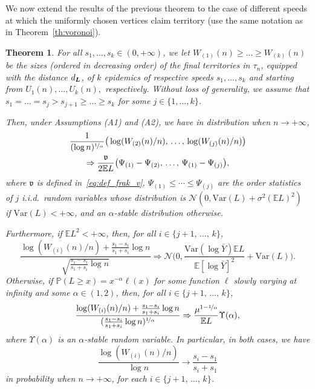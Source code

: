 \documentclass[10pt]{amsart}
\newtheorem{theo}{Theorem}[section]
\theoremstyle{definition}\newtheorem{defi}[theo]{Definition}\newtheorem{rema}[theo]{Remark}\newtheorem{exam}[theo]{Example}\newtheorem{exem}[theo]{Example}\newtheorem{nota}[theo]{Notation}
\newcommand{\bs}{\ensuremath{\boldsymbol}}
\newcommand{\bbP}{\mathbb{P}}
\newcommand{\bbE}{\mathbb{E}}
\newcommand{\clN}{\mathcal{N}}
\newcommand{\Var}{\mathrm{Var}}
\newcommand{\frkv}{\mathfrak{v}}
\begin{document}
We now extend the results of the previous theorem to the case of different speeds at which the uniformly chosen vertices claim territory (use the same notation as in Theorem~\ref{th:voronoi}).


\begin{theo}\label{th:territories}
For all $s_1, \ldots, s_k\in (0,+\infty)$, we let $W_{(1)}(n)\geq \ldots \geq W_{(k)}(n)$ be the sizes (ordered in decreasing order) of the final territories in $\tau_n$, equipped with the distance $d_{\bs L}$, of $k$ epidemics of respective speeds $s_1, \ldots, s_k$ and starting from $U_1(n), \ldots, U_k(n),$ respectively. Without loss of generality, we assume that $s_1 = \ldots = s_j > s_{j+1} \geq \ldots\geq s_k$ for some $j\in\{1,\dots,k\}$.

Then, under Assumptions {\rm (A1)} and {\rm (A2)}, we have in distribution when $n\to+\infty$,
\begin{multline}\label{eq:terPrincipalConv}
\frac1{(\log n)^{\nicefrac1\alpha}}\big(\log (W_{(2)}(n)/n), \,\ldots,\, \log (W_{(j)}(n)/n)\big)\\
\Rightarrow\frac{\frkv}{2\bbE L}
\big(\Psi_{(1)}-\Psi_{(2)}, \,\ldots,\, \Psi_{(1)}-\Psi_{(j)}\big),
\end{multline}
where $\frkv$ is defined in~\eqref{eq:def_frak_v}, $\Psi_{(1)}\leq \cdots\leq \Psi_{(j)}$ are the order statistics of $j$ i.i.d.\ random variables whose distribution is $\clN(0, \Var(L) + \sigma^2 (\bbE L)^2)$ if $\Var(L)<+\infty$, and an $\alpha$-stable distribution otherwise.

Furthermore, if $\bbE L^2<+\infty$, then, for all $i \in \{j+1, \,\ldots,\, k\}$,
\[
\frac{\log(W_{(i)}(n)/n) + \frac{s_1-s_i}{s_1+s_i}\log n}{\sqrt{\frac{s_1-s_i}{s_1+s_i}\log n}}
\Rightarrow \clN\bigg(0, \frac{\Var(\log \bar Y)\bbE L}{\bbE[\log\bar Y]^2}+\Var(L)\bigg).
\]
Otherwise, if $\bbP(L\geq x) = x^{-\alpha}\ell(x)$ for some function $\ell$ slowly varying at infinity and some $\alpha\in(1,2)$, then, for all $i \in \{j+1, \,\ldots,\, k\}$,
\[
\frac{\log (W_{(i)}(n)/n)+\frac{s_1-s_i}{s_1+s_i} \log n}{(\frac{s_1-s_i}{s_1+s_i} \log n)^{\nicefrac1\alpha}}
\Rightarrow \frac{\mu^{1-\nicefrac1\alpha}}{\bbE L}\Upsilon(\alpha),
\]
where $\Upsilon(\alpha)$ is an $\alpha$-stable random variable. In particular, in both cases, we have
\begin{equation}\label{eq:terMinorConv}
\frac{\log(W_{(i)}(n)/n)}{\log n} \to \frac{s_i-s_1}{s_i+s_1}
\end{equation}
in probability when $n\to+\infty$, for each $i \in \{j+1,\,\ldots,\, k\}$.
\end{theo}
\end{document}
